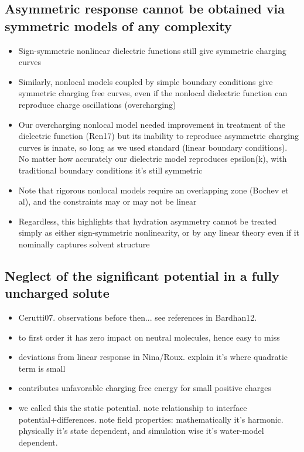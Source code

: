 \documentclass[reprint, letterpaper, nobibnotes, aps, superscriptaddress,prb]{revtex4-1}
\begin{document}
\subsection{Asymmetric response cannot be obtained via symmetric models of any complexity}
\begin{itemize}
\item Sign-symmetric nonlinear dielectric functions still give symmetric charging curves
\item Similarly, nonlocal models coupled by simple boundary conditions give symmetric charging free curves, even if the nonlocal dielectric function can reproduce charge oscillations (overcharging)
\item Our overcharging nonlocal model needed improvement in treatment of the dielectric function (Ren17) but its inability to reproduce asymmetric charging curves is innate, so long as we used standard (linear boundary conditions).  No matter how accurately our dielectric model reproduces epsilon(k), with traditional boundary conditions it's still symmetric
\item Note that rigorous nonlocal models require an overlapping zone (Bochev et al), and the constraints may or may not be linear
\item Regardless, this highlights that hydration asymmetry cannot be treated simply as either sign-symmetric nonlinearity, or by any linear theory even if it nominally captures solvent structure
\end{itemize}

\subsection{Neglect of the significant potential in a fully uncharged solute}

\begin{itemize}
\item Cerutti07. observations before then... see references in Bardhan12.
\item to first order it has zero impact on neutral molecules, hence easy to miss
\item deviations from linear response in Nina/Roux. explain it's where
  quadratic term is small
\item contributes unfavorable charging free energy for small positive charges
\item we called this the static potential. note relationship to
  interface potential+differences.  note field properties:
  mathematically it's harmonic. physically it's state dependent, and
  simulation wise it's water-model dependent.  
\end{itemize}
\end{document}
